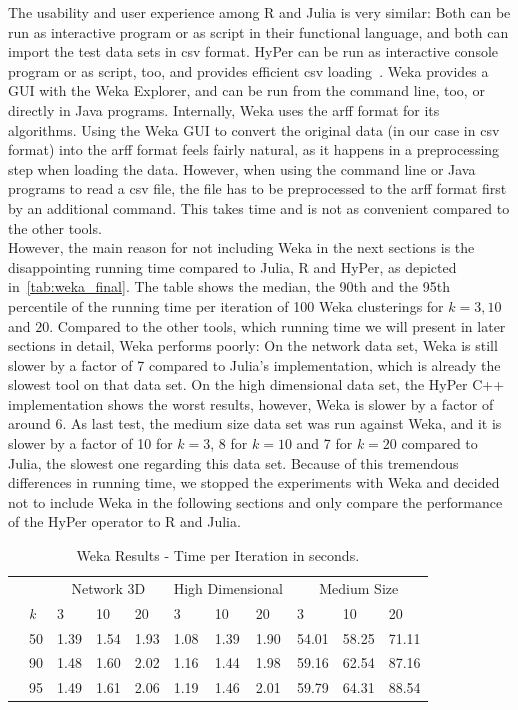 The usability and user experience among R and Julia is very similar: Both can be run as interactive program or as script in their functional language, and both can import the test data sets in csv format. HyPer can be run as interactive console program or as script, too, and provides efficient csv loading~\parencite{hypercsv}. Weka provides a GUI with the Weka Explorer, and can be run from the command line, too, or directly in Java programs. Internally, Weka uses the arff format for its algorithms. Using the Weka GUI to convert the original data (in our case in csv format) into the arff format feels fairly natural, as it happens in a preprocessing step when loading the data. However, when using the command line or Java programs to read a csv file, the file has to be preprocessed to the arff format first by an additional command. This takes time and is not as convenient compared to the other tools.
\\
However, the main reason for not including Weka in the next sections is the disappointing running time compared to Julia, R and HyPer, as depicted in~\autoref{tab:weka_final}. The table shows the median, the 90th and the 95th percentile of the running time per iteration of 100 Weka clusterings for $k = 3, 10$ and $20$. Compared to the other tools, which running time we will present in later sections in detail, Weka performs poorly: On the network data set, Weka is still slower by a factor of 7 compared to Julia's implementation, which is already the slowest tool on that data set. On the high dimensional data set, the HyPer C++ implementation shows the worst results, however, Weka is slower by a factor of around 6. As last test, the medium size data set was run against Weka, and it is slower by a factor of 10 for $k = 3$, 8 for $k = 10$ and 7 for $k = 20$ compared to Julia, the slowest one regarding this data set. Because of this tremendous differences in running time, we stopped the experiments with Weka and decided not to include Weka in the following sections and only compare the performance of the HyPer operator to R and Julia.

\begin{table}[htsb]
  \caption[Weka Results - Time per Iteration]{Weka Results - Time per Iteration in seconds.}
  \label{tab:weka_final}
  \centering
  \begin{tabular}{ll l l l |l l l |l l l }
    \toprule
      &  & \multicolumn{3}{c}{Network 3D} & \multicolumn{3}{c}{High Dimensional} & \multicolumn{3}{c}{Medium Size}  \\
      & \emph{k} & 3 & 10 & 20 & 3 & 10 & 20 & 3 & 10 & 20 \\
    \midrule
      \parbox[t]{2mm}{} & 50  & 1.39 & 1.54 & 1.93 & 1.08 & 1.39 & 1.90 & 54.01 & 58.25 & 71.11 \\
      & 90  & 1.48 & 1.60 & 2.02 & 1.16 & 1.44 & 1.98 &59.16 & 62.54 & 87.16 \\
      & 95  & 1.49 & 1.61 & 2.06 & 1.19 & 1.46 & 2.01 & 59.79 & 64.31 & 88.54 \\
    \bottomrule
  \end{tabular}
\end{table}


